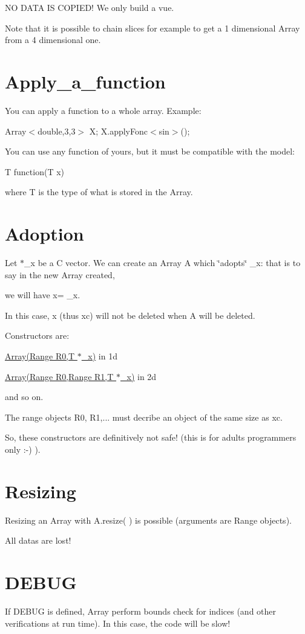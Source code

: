 N\+O D\+A\+T\+A I\+S C\+O\+P\+I\+E\+D! We only build a vue.

Note that it is possible to chain slices for example to get a 1 dimensional Array from a 4 dimensional one.\hypertarget{index_Apply_a_function}{}\section{Apply\+\_\+a\+\_\+function}\label{index_Apply_a_function}
You can apply a function to a whole array. Example\+:

Array$<$double,3,3$>$ X; X.\+apply\+Fonc$<$sin$>$();

You can use any function of yours, but it must be compatible with the model\+:

T function(\+T x)

where T is the type of what is stored in the Array.\hypertarget{index_Adoption}{}\section{Adoption}\label{index_Adoption}
Let $\ast$\+\_\+x be a C vector. We can create an Array A which \char`\"{}adopts\char`\"{} \+\_\+x\+: that is to say in the new Array created,

we will have x= \+\_\+x.

In this case, x (thus xc) will not be deleted when A will be deleted.

Constructors are\+:

\hyperlink{Array__Constructors__RangeBased__NotSafe_8hpp_a5eab639d9e13b4310ee35829a788598b}{Array(\+Range R0,\+T $\ast$\+\_\+x)} in 1d

\hyperlink{Array__Constructors__RangeBased__NotSafe_8hpp_a101a96449298f36a34a256bdee252c28}{Array(\+Range R0,\+Range R1,\+T $\ast$\+\_\+x)} in 2d

and so on.

The range objects R0, R1,... must decribe an object of the same size as xc.

So, these constructors are definitively not safe! (this is for adults programmers only \+:-\/) ).\hypertarget{index_Resizing}{}\section{Resizing}\label{index_Resizing}
Resizing an Array with A.\+resize( ) is possible (arguments are Range objects).

All datas are lost!\hypertarget{index_DEBUG}{}\section{D\+E\+B\+U\+G}\label{index_DEBUG}
If D\+E\+B\+U\+G is defined, Array perform bounds check for indices (and other verifications at run time). In this case, the code will be slow! 